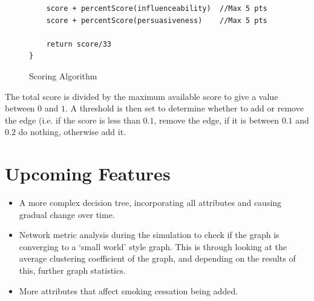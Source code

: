 \documentclass[]{article}
\begin{document}
\begin{enumerate}
\begin{figure}
\begin{center}
\begin{lstlisting}
	score + percentScore(influenceability)	//Max 5 pts
	score + percentScore(persuasiveness)	//Max 5 pts

	return score/33
}
	\end{lstlisting}
\end{center}
\label{pseudo}
\caption{Scoring Algorithm}
\end{figure}
The total score is divided by the maximum available score to give a value between $0$ and $1$. A threshold is then set to determine whether to add or remove the edge (i.e. if the score is less than $0.1$, remove the edge, if it is between $0.1$ and $0.2$ do nothing, otherwise add it.

\end{enumerate}
\section{Upcoming Features}
\begin{itemize}
\item A more complex decision tree, incorporating all attributes and causing gradual change over time.
\item Network metric analysis during the simulation to check if the graph is converging to a `small world' style graph. This is through looking at the average clustering coefficient of the graph, and depending on the results of this, further graph statistics.
\item More attributes that affect smoking cessation being added.
\end{itemize}
\end{document}
